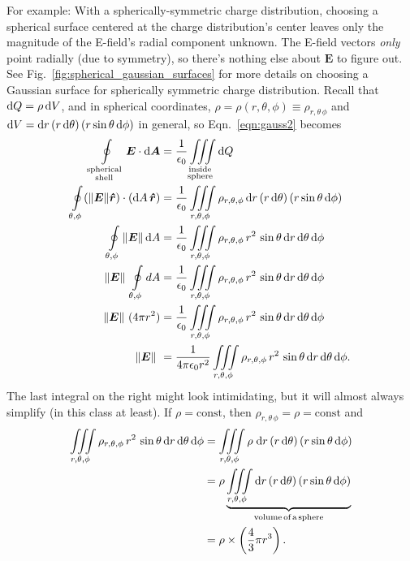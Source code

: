 \documentclass[10pt,letterpaper,twoside]{article}
\begin{document}
For example: With a spherically-symmetric charge distribution, choosing a spherical surface centered at the charge distribution's center leaves only the magnitude of the E-field's radial component unknown.
The E-field vectors \textit{only} point radially (due to symmetry), so there's nothing else about $\bm E$ to figure out.
See Fig.~\ref{fig:spherical_gaussian_surfaces} for more details on choosing a Gaussian surface for spherically symmetric charge distribution.
Recall that $\text d Q = \rho \, \text d V$, and in spherical coordinates, $\rho=\rho(r,\theta,\phi)\equiv\rho_{r,\theta\,\phi}$ and $\text d V = \text d r  \, (r \, \text d \theta) \, (r \sin\theta\,\text d\phi)$ in general, so Eqn.~\ref{eqn:gauss2} becomes
\begin{align*}
  \oint\limits_{\substack{\mathrm{spherical}\\\mathrm{shell}}} \bm E\cdot \mathrm{d}\bm A &= \frac{1}{\epsilon_0}\iiint\limits_{\substack{\mathrm{inside}\\ \mathrm{sphere}}} \text d Q \\
  \oint\limits_{\theta,\phi} (\|\bm E\|\bm{\hat r}) \cdot (\mathrm{d}A\,\bm{\hat r}) &= \frac{1}{\epsilon_0}\iiint\limits_{r,\theta,\phi} \rho_{r,\theta,\phi} \, \text d r  \, (r \, \text d \theta) \, (r \sin\theta\,\text d\phi)\\
  \oint\limits_{\theta,\phi} \|\bm E\|\,\mathrm{d}A &= \frac{1}{\epsilon_0}\iiint\limits_{r,\theta,\phi} \rho_{r,\theta,\phi} \, r^2 \, \sin\theta \, \text d r  \, \text d \theta \, \text d\phi\\
  \|\bm E\|\ \oint\limits_{\theta,\phi} {d}A &= \frac{1}{\epsilon_0}\iiint\limits_{r,\theta,\phi} \rho_{r,\theta,\phi} \, r^2 \, \sin\theta \, \text d r  \, \text d \theta \, \text d\phi\\
  \|\bm E\|\ (4\pi r^2) &= \frac{1}{\epsilon_0}\iiint\limits_{r,\theta,\phi} \rho_{r,\theta,\phi} \, r^2 \, \sin\theta \, \text d r  \, \text d \theta \, \text d\phi\\
  \|\bm E\|\ &= \frac{1}{4\pi\epsilon_0 r^2}\iiint\limits_{r,\theta,\phi}  \rho_{r,\theta,\phi} \, r^2 \, \sin\theta \, \text d r  \, \text d \theta \, \text d\phi.
\end{align*}
The last integral on the right might look intimidating, but it will almost always simplify (in this class at least).
If $\rho=\text{const}$, then $\rho_{r,\theta\,\phi}=\rho=\text{const}$ and
\begin{align*}
	\iiint\limits_{r,\theta,\phi} \rho_{r,\theta,\phi} \, r^2 \, \sin\theta \, \text d r  \, \text d \theta \, \text d\phi &= \iiint\limits_{r,\theta,\phi} \rho \; \text d r  \, (r \, \text d \theta) \, (r \sin\theta\,\text d\phi) \\
	 &= \rho \underbrace{\iiint\limits_{r,\theta,\phi} \text d r  \, (r \, \text d \theta) \, (r \sin\theta\,\text d\phi)}_\text{volume\,of\,a\,sphere} \\
	 &= \rho \times \left( \frac{4}{3}\pi r^3 \right).
\end{align*}
\end{document}
